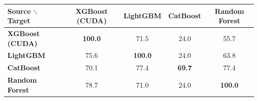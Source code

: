 \begin{tabular}{@{}lcccc@{}}
\toprule
\textbf{Source $\backslash$ Target} & \textbf{XGBoost (CUDA)} & \textbf{LightGBM} & \textbf{CatBoost} & \textbf{Random Forest} \\
\midrule
\textbf{XGBoost (CUDA)} & \textbf{100.0} & 71.5 & 24.0 & 55.7 \\
\textbf{LightGBM} & 75.6 & \textbf{100.0} & 24.0 & 63.8 \\
\textbf{CatBoost} & 70.1 & 77.4 & \textbf{69.7} & 77.4 \\
\textbf{Random Forest} & 78.7 & 71.0 & 24.0 & \textbf{100.0} \\
\bottomrule
\end{tabular}
